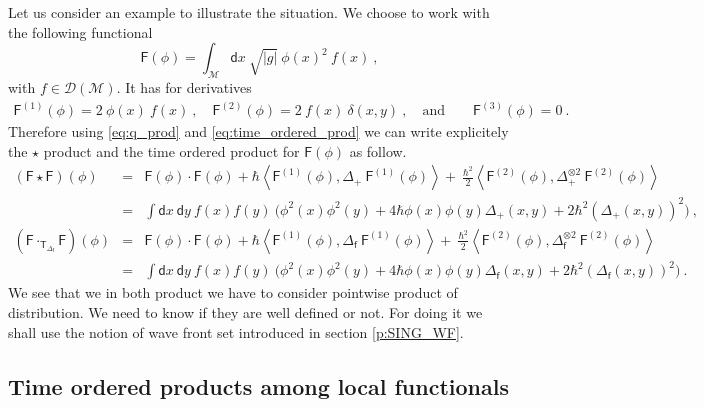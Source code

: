 \documentclass[11pt]{book}
\newcommand{\abs}[1]{\left|#1\right|}
\newcommand{\sm}[1]{\left\langle#1\right\rangle}
\newcommand{\Dcal}{\mathcal{D}}
\newcommand{\Mcal}{\mathcal{M}}
\newcommand{\Fsf}{\mathsf{F}}
\newcommand{\Tsf}{\mathsf{T}}
\newcommand{\dsf}{\mathsf{d}}
\newcommand{\fsf}{\mathsf{f}}
\theoremstyle{break}
\begin{document}
Let us consider an example to illustrate the situation. We choose to work with the following functional
%
\begin{equation*}
\Fsf(\phi) = \int_\Mcal \dsf x \ \sqrt{\abs{g}} \ \phi(x)^2 \ f(x)  \ ,
\end{equation*}
%
with $f \in \Dcal(\Mcal)$. It has for derivatives
%
\begin{eqnarray*}
\Fsf^{(1)}(\phi) = 2 \ \phi(x) \ f(x) \ , \quad \Fsf^{(2)}(\phi) = 2 \ f(x) \ \delta(x,y) \ , \quad \mbox{and} \qquad \Fsf^{(3)}(\phi) = 0 \ .
\end{eqnarray*}
%
Therefore using \eqref{eq:q_prod} and \eqref{eq:time_ordered_prod} we can write explicitely the $\star$ product and the time ordered product for $\Fsf(\phi)$ as follow.
%
\begin{eqnarray*}
(\Fsf \star \Fsf)(\phi) &=& \Fsf(\phi) \cdot \Fsf(\phi) + \hbar \sm{ \Fsf^{(1)}(\phi) , \Delta_+ \ \Fsf^{(1)}(\phi) } + \ \frac{\hbar^2}{2} \sm{ \Fsf^{(2)}(\phi) , \Delta_+^{\otimes 2} \ \Fsf^{(2)}(\phi)} \\
%
&=& \int \dsf x \ \dsf y \ f(x) f(y) \ \bigg( \phi^2(x) \phi^2(y) + 4 \hbar \phi(x) \phi(y) \Delta_+(x,y) + 2 \hbar^2 \left(\Delta_+(x,y)\right)^2 \bigg) \ , \\[8pt]
%
(\Fsf \cdot_{\Tsf_{\Delta_\fsf}} \Fsf)(\phi) &=& \Fsf(\phi) \cdot \Fsf(\phi) + \hbar \sm{ \Fsf^{(1)}(\phi) , \Delta_\fsf \ \Fsf^{(1)}(\phi) } + \ \frac{\hbar^2}{2} \sm{ \Fsf^{(2)}(\phi) , \Delta_\fsf^{\otimes 2} \ \Fsf^{(2)}(\phi)} \\
%
&=& \int \dsf x \ \dsf y \ f(x) f(y) \ \bigg( \phi^2(x) \phi^2(y) + 4 \hbar \phi(x) \phi(y) \Delta_\fsf(x,y) + 2 \hbar^2 \left(\Delta_\fsf(x,y)\right)^2 \bigg) \ .
\end{eqnarray*}
%
We see that we in both product we have to consider pointwise product of distribution. We need to know if they are well defined or not. For doing it we shall use the notion of wave front set introduced in section \ref{p:SING_WF}.


\subsection{Time ordered products among local functionals}
\end{document}
